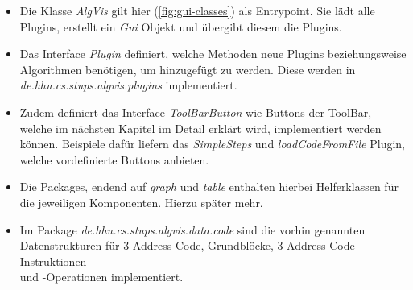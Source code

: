 \newpage
\begin{itemize}
  \item Die Klasse \textit{AlgVis} gilt hier (\cref{fig:gui-classes}) als Entrypoint. 
    Sie lädt alle Plugins, erstellt ein \textit{Gui} Objekt und übergibt diesem die Plugins.
  \item Das Interface \textit{Plugin} definiert, welche Methoden neue Plugins
    beziehungsweise Algorithmen
    benötigen, um hinzugefügt zu werden. Diese werden in\\
    \textit{de.hhu.cs.stups.algvis.plugins} implementiert.
  \item Zudem definiert das Interface \textit{ToolBarButton} wie Buttons der ToolBar,
    welche im nächsten Kapitel im Detail erklärt wird, implementiert werden können.
    Beispiele dafür liefern das \textit{SimpleSteps} und \textit{loadCodeFromFile} Plugin,
    welche vordefinierte Buttons anbieten.
  \item Die Packages, endend auf \textit{graph} und \textit{table} enthalten hierbei Helferklassen 
    für die jeweiligen Komponenten. Hierzu später mehr.
  \item Im Package \textit{de.hhu.cs.stups.algvis.data.code} sind die vorhin genannten Datenstrukturen
    für 3-Address-Code, Grundblöcke, 3-Address-Code-Instruktionen\\ 
    und -Operationen implementiert.
\end{itemize}

